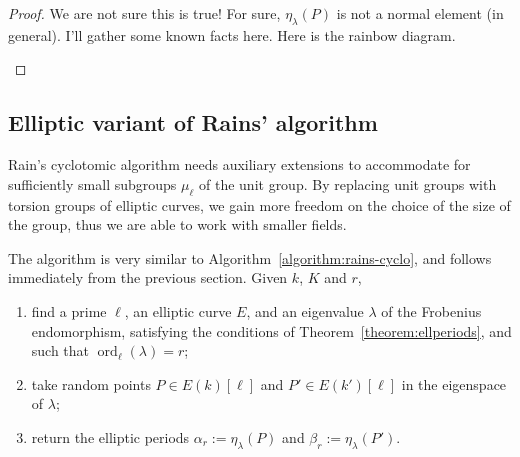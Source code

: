 \documentclass[12pt]{article}
\theoremstyle{plain}
\theoremstyle{definition}
\DeclareMathOperator{\order}{ord} %
\newcounter{algorithm}
\begin{document}
\begin{proof}
We are not sure this is true!
For sure, $\eta_\lambda(P)$ is not a normal element (in general).
I'll gather some known facts here.
Here is the rainbow diagram.
\begin{center}
\end{center}
\end{proof}

\subsection{Elliptic variant of Rains' algorithm}

Rain's cyclotomic algorithm needs auxiliary extensions to accommodate
for sufficiently small subgroups $\mu_\ell$ of the unit group. By
replacing unit groups with torsion groups of elliptic curves, we gain
more freedom on the choice of the size of the group, thus we are able
to work with smaller fields.  

The algorithm is very similar to
Algorithm~\ref{algorithm:rains-cyclo}, and follows immediately from
the previous section. Given $k$, $K$ and $r$,
\begin{enumerate}
\item find a prime $\ell$, an elliptic curve $E$, and an eigenvalue
  $\lambda$ of the Frobenius endomorphism, satisfying the conditions
  of Theorem~\ref{theorem:ellperiods}, and such that
  $\order_\ell(\lambda)=r$;
\item take random points $P\in E(k)[\ell]$ and $P'\in E(k')[\ell]$ in
  the eigenspace of $\lambda$;
\item return the elliptic periods $\alpha_r := \eta_{\lambda}(P)$ and
  $\beta_r:= \eta_\lambda(P')$.
\end{enumerate}
\end{document}
